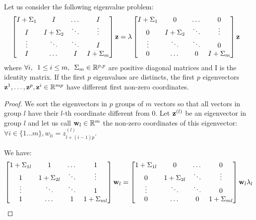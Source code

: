 \documentclass{report}
\begin{document}
{\begin{lemma}
\label{lemma:nonzerocoord}
Let us consider the following eigenvalue problem:
 \begin{align}
  & \begin{bmatrix} I + \Sigma_1 & I & \dots & I \\
    I & I + \Sigma_2 & \ddots & \vdots \\
    \vdots &  \ddots & \ddots & I  \\
    I & \dots & I  &I + \Sigma_m
  \end{bmatrix} \mathbf{z} = \lambda \begin{bmatrix}
    I + \Sigma_1 & 0 & \dots  & 0 \\
    0 & I + \Sigma_2 & \ddots & \vdots \\
    \vdots & \ddots & \ddots & 0 \\
    0& \dots  & 0 &  I + \Sigma_m  \\
  \end{bmatrix} \mathbf{z}
  \label{reducedeig}
\end{align}
where $\forall i, \enspace 1 \leq i \leq m, \enspace  \Sigma_m \in \mathbb{R}^{p, p}$ are positive diagonal matrices and I is the identity matrix.
If the first $p$ eigenvalues are distincts, the first $p$ eigenvectors $\mathbf{z}^1, \dots, \mathbf{z}^p, \mathbf{z}^i \in \mathbb{R}^{mp}$ have different first non-zero coordinates.
\end{lemma}
\begin{proof}
We sort the eigenvectors in $p$ groups of $m$ vectors so that all
vectors in group $l$ have their $l$-th coordinate
different from 0.
Let $\mathbf{z}^{(l)}$ be an eigenvector in group $l$ and let us call $\mathbf{w}_l \in
\mathbb{R}^{m}$ the non-zero coordinates of this eigenvector: $\forall i \in \{1 \dots m \}, w_{li} = z^{(l)}_{l + (i-1)p}$.

We have:
\begin{align}
\begin{bmatrix}
  1 + \Sigma_{1l} & 1 & \dots & 1  \\
  1 & 1 + \Sigma_{2l} & \ddots  &\vdots \\
  \vdots & \ddots & \ddots & 1  \\
  1 & \dots & 1 & 1 + \Sigma_{ml}  \\
\end{bmatrix} \mathbf{w}_l =  \begin{bmatrix}
  1 + \Sigma_{1l} & 0 & \dots  & 0 \\
  0 & 1 + \Sigma_{2l} & \ddots & \vdots \\
  \vdots & \ddots & \ddots & 0 \\
  0& \dots  & 0 &  1 + \Sigma_{ml}  \\
\end{bmatrix} \mathbf{w}_l \lambda_l
\label{eigsimp}
\end{align}


\end{proof}}
\end{document}
